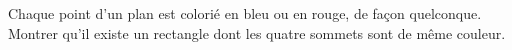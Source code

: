 Chaque point d'un plan est colorié en bleu ou en rouge, de façon quelconque. Montrer qu'il existe un rectangle dont les quatre sommets sont de même couleur.
